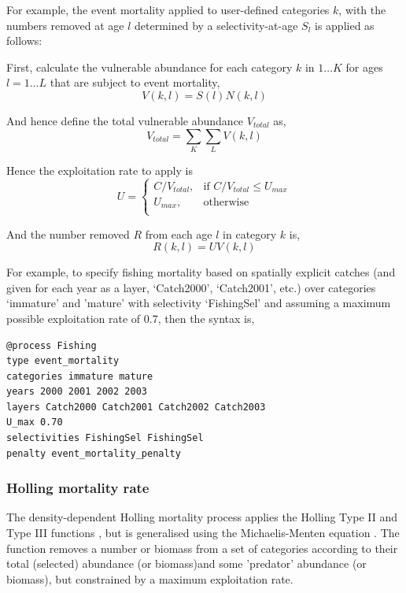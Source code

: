 For example, the event mortality applied to user-defined categories $k$, with the numbers removed at age $l$ determined by a selectivity-at-age $S_l$ is applied as follows:

First, calculate the vulnerable abundance for each category $k$ in $1 \ldots K$ for ages $l = 1 \ldots L$ that are subject to event mortality,
\begin{equation}
  V(k,l) = S(l) N(k,l)
\end{equation}

And hence define the total vulnerable abundance $V_{total}$ as,
\begin{equation}
  V_{total}  = \sum\limits_K {\sum\limits_L {V(k,l)}} 
\end{equation}

Hence the exploitation rate to apply is 
\begin{equation}
U = \begin{cases}
  C/V_{total}, & \text{if $C/V_{total} \leq U_{max}$} \\
  U_{max}, & \text{otherwise}\\ 
  \end{cases} 
\end{equation}

And the number removed $R$ from each age $l$ in category $k$ is,
\begin{equation}
  R(k,l) = UV(k,l)
\end{equation}

For example, to specify fishing mortality based on spatially explicit catches (and given for each year as a layer, `Catch2000', `Catch2001', etc.) over categories `immature' and 'mature' with selectivity `FishingSel' and assuming a maximum possible exploitation rate of 0.7, then the syntax is,

{\small{\begin{verbatim}
@process Fishing
type event_mortality
categories immature mature
years 2000 2001 2002 2003
layers Catch2000 Catch2001 Catch2002 Catch2003
U_max 0.70
selectivities FishingSel FishingSel
penalty event_mortality_penalty
\end{verbatim}}}

\subsubsection*{Holling mortality rate}

The density-dependent Holling mortality process applies the Holling Type II and Type III functions \citep{Holling1959}, but is generalised using the Michaelis-Menten equation \citep{MentenMichaelis1913}. The function removes a number or biomass from a set of categories according to their total (selected) abundance (or biomass)and some 'predator' abundance (or biomass), but constrained by a maximum exploitation rate.

